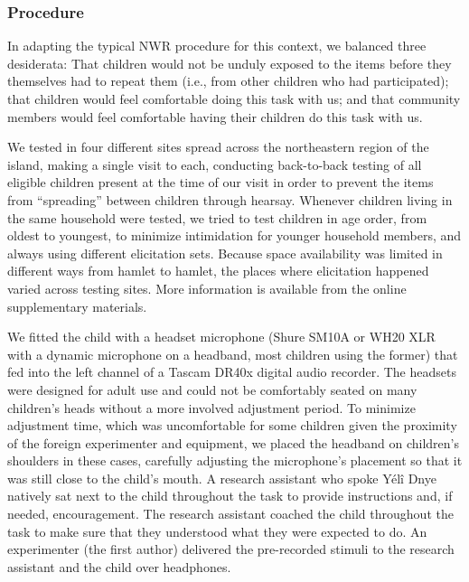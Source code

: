 \documentclass[english,,man,floatsintext]{apa6}
\begin{document}
\hypertarget{procedure}{%
\subsubsection{Procedure}\label{procedure}}

In adapting the typical NWR procedure for this context, we balanced three desiderata: That children would not be unduly exposed to the items before they themselves had to repeat them (i.e., from other children who had participated); that children would feel comfortable doing this task with us; and that community members would feel comfortable having their children do this task with us.

We tested in four different sites spread across the northeastern region of the island, making a single visit to each, conducting back-to-back testing of all eligible children present at the time of our visit in order to prevent the items from \enquote{spreading} between children through hearsay. Whenever children living in the same household were tested, we tried to test children in age order, from oldest to youngest, to minimize intimidation for younger household members, and always using different elicitation sets. Because space availability was limited in different ways from hamlet to hamlet, the places where elicitation happened varied across testing sites. More information is available from the online supplementary materials.

We fitted the child with a headset microphone (Shure SM10A or WH20 XLR with a dynamic microphone on a headband, most children using the former) that fed into the left channel of a Tascam DR40x digital audio recorder. The headsets were designed for adult use and could not be comfortably seated on many children's heads without a more involved adjustment period. To minimize adjustment time, which was uncomfortable for some children given the proximity of the foreign experimenter and equipment, we placed the headband on children's shoulders in these cases, carefully adjusting the microphone's placement so that it was still close to the child's mouth. A research assistant who spoke Yélî Dnye natively sat next to the child throughout the task to provide instructions and, if needed, encouragement. The research assistant coached the child throughout the task to make sure that they understood what they were expected to do. An experimenter (the first author) delivered the pre-recorded stimuli to the research assistant and the child over headphones.
\end{document}
